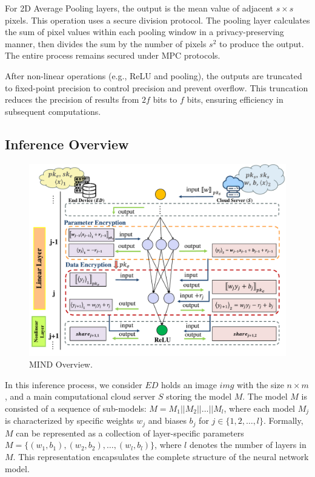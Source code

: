 \documentclass[conference]{IEEEtran}
\begin{document}
For 2D Average Pooling layers, the output is the mean value of adjacent $s \times s$ pixels. This operation uses a secure division protocol. The pooling layer calculates the sum of pixel values within each pooling window in a privacy-preserving manner, then divides the sum by the number of pixels $s^2$ to produce the output. The entire process remains secured under MPC protocols.

After non-linear operations (e.g., ReLU and pooling), the outputs are truncated to fixed-point precision to control precision and prevent overflow. This truncation reduces the precision of results from $2f$ bits to $f$ bits, ensuring efficiency in subsequent computations.

\subsection{Inference Overview}


\begin{figure}[ht]
\centering
\includegraphics[scale=0.7]{fig3.pdf}
\caption{MIND Overview.} \label{fig:MIND Overview}
\end{figure}


In this inference process, we consider $ED$ holds an image $img$ with the size $n\times m$, and a main computational cloud server $S$ storing the model $M$. The model $M$ is consisted of a sequence of sub-models: $M=M_1 || M_2 || \dots || M_l$, where each model $M_j$ is characterized by specific weights $w_{j}$ and biases $b_{j}$ for $j \in \{1, 2, \dots, l\}$. Formally, $M$ can be represented as a collection of layer-specific parameters $M=\{(w_{1},b_{1}),(w_{2},b_{2}),\dots,(w_{l},b_{l})\}$, where $l$ denotes the number of layers in $M$. This representation encapsulates the complete structure of the neural network model.
\end{document}

